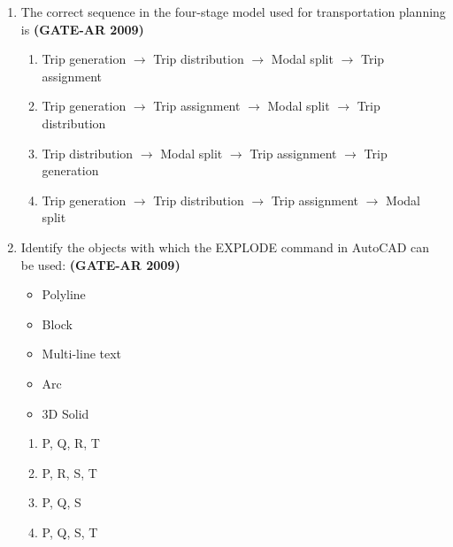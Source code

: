 \documentclass[a4paper,10pt]{article}
\begin{document}
\begin{enumerate}
    \item The correct sequence in the four-stage model used for transportation planning is \hfill \textbf{(GATE-AR 2009)}
    \begin{enumerate}
        \item Trip generation $\to$ Trip distribution $\to$ Modal split $\to$ Trip assignment
        \item Trip generation $\to$ Trip assignment $\to$ Modal split $\to$ Trip distribution
        \item Trip distribution $\to$ Modal split $\to$ Trip assignment $\to$ Trip generation
        \item Trip generation $\to$ Trip distribution $\to$ Trip assignment $\to$ Modal split
    \end{enumerate}

    \item Identify the objects with which the EXPLODE command in AutoCAD can be used: \hfill \textbf{(GATE-AR 2009)}
    \begin{itemize}
		\item Polyline
		\item Block
		\item Multi-line text
		\item Arc
		\item 3D Solid
	\end{itemize}
	\begin{multicols}{4}
	\begin{enumerate}
        \item P, Q, R, T
        \item P, R, S, T
        \item P, Q, S
        \item P, Q, S, T
    \end{enumerate}
	\end{multicols}


\end{enumerate}
\end{document}
